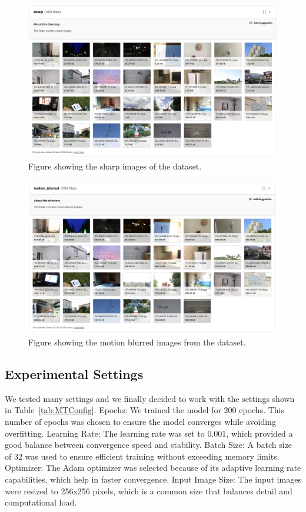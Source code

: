 \documentclass[conference]{IEEEtran}
\begin{document}
\begin{figure}[!t]
\centering
\includegraphics[width=17.8cm]{Figures/Figure3.png}
\caption{Figure showing the sharp images of the dataset.}
\label{Fig:Figure3}
\end{figure}


\begin{figure}[!t]
\centering
\includegraphics[width=17.8cm]{Figures/Figure4.png}
\caption{Figure showing the motion blurred images from the dataset.}
\label{Fig:Figure4}
\end{figure}

\subsection{Experimental Settings}
We tested many settings and we finally decided to work with the settings shown in Table~\ref{tab:MTConfig}.
Epochs: We trained the model for 200 epochs. This number of epochs was chosen to ensure the model converges while avoiding overfitting.
Learning Rate: The learning rate was set to 0.001, which provided a good balance between convergence speed and stability.
Batch Size: A batch size of 32 was used to ensure efficient training without exceeding memory limits.
Optimizer: The Adam optimizer was selected because of its adaptive learning rate capabilities, which help in faster convergence.
Input Image Size: The input images were resized to 256x256 pixels, which is a common size that balances detail and computational load.
\end{document}
